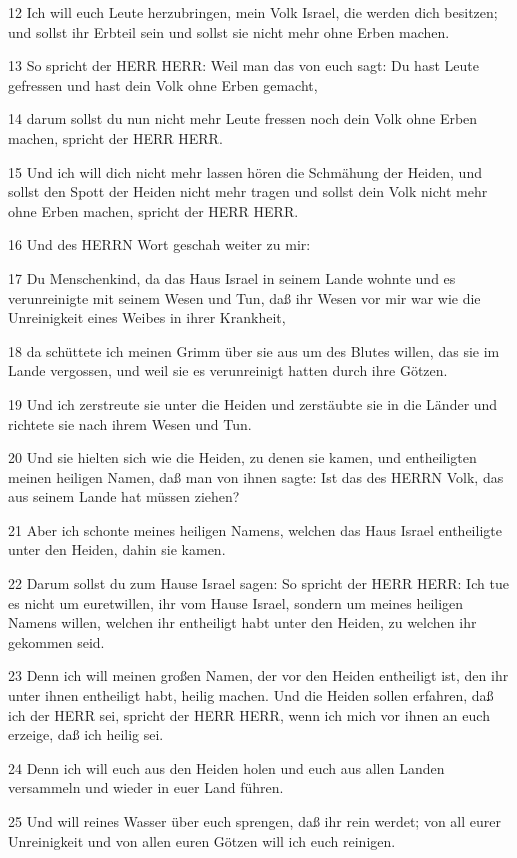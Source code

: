 \par 12 Ich will euch Leute herzubringen, mein Volk Israel, die werden dich besitzen; und sollst ihr Erbteil sein und sollst sie nicht mehr ohne Erben machen.
\par 13 So spricht der HERR HERR: Weil man das von euch sagt: Du hast Leute gefressen und hast dein Volk ohne Erben gemacht,
\par 14 darum sollst du nun nicht mehr Leute fressen noch dein Volk ohne Erben machen, spricht der HERR HERR.
\par 15 Und ich will dich nicht mehr lassen hören die Schmähung der Heiden, und sollst den Spott der Heiden nicht mehr tragen und sollst dein Volk nicht mehr ohne Erben machen, spricht der HERR HERR.
\par 16 Und des HERRN Wort geschah weiter zu mir:
\par 17 Du Menschenkind, da das Haus Israel in seinem Lande wohnte und es verunreinigte mit seinem Wesen und Tun, daß ihr Wesen vor mir war wie die Unreinigkeit eines Weibes in ihrer Krankheit,
\par 18 da schüttete ich meinen Grimm über sie aus um des Blutes willen, das sie im Lande vergossen, und weil sie es verunreinigt hatten durch ihre Götzen.
\par 19 Und ich zerstreute sie unter die Heiden und zerstäubte sie in die Länder und richtete sie nach ihrem Wesen und Tun.
\par 20 Und sie hielten sich wie die Heiden, zu denen sie kamen, und entheiligten meinen heiligen Namen, daß man von ihnen sagte: Ist das des HERRN Volk, das aus seinem Lande hat müssen ziehen?
\par 21 Aber ich schonte meines heiligen Namens, welchen das Haus Israel entheiligte unter den Heiden, dahin sie kamen.
\par 22 Darum sollst du zum Hause Israel sagen: So spricht der HERR HERR: Ich tue es nicht um euretwillen, ihr vom Hause Israel, sondern um meines heiligen Namens willen, welchen ihr entheiligt habt unter den Heiden, zu welchen ihr gekommen seid.
\par 23 Denn ich will meinen großen Namen, der vor den Heiden entheiligt ist, den ihr unter ihnen entheiligt habt, heilig machen. Und die Heiden sollen erfahren, daß ich der HERR sei, spricht der HERR HERR, wenn ich mich vor ihnen an euch erzeige, daß ich heilig sei.
\par 24 Denn ich will euch aus den Heiden holen und euch aus allen Landen versammeln und wieder in euer Land führen.
\par 25 Und will reines Wasser über euch sprengen, daß ihr rein werdet; von all eurer Unreinigkeit und von allen euren Götzen will ich euch reinigen.
